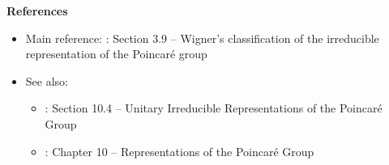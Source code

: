 
\vskip 1.0cm
\noindent
\textbf{References}
\begin{itemize}
\item
	Main reference:
	\vskip 0.1cm
	\cite{Sternberg1994}: Section 3.9 -- Wigner's classification of the irreducible representation of the Poincaré group
\item
	See also:
	\begin{itemize}
	\item
		\cite{Tung1985}: Section 10.4 -- Unitary Irreducible Representations of the Poincaré Group
	\item
		\cite{Jones2020}: Chapter 10 -- Representations of the Poincaré Group
	\end{itemize}
\end{itemize}

